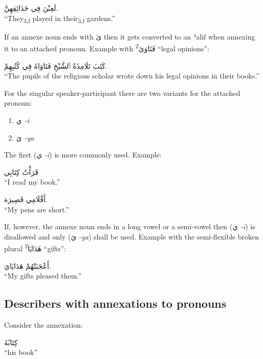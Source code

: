 \documentclass[
  10pt,
]{book}
\providecommand{\tightlist}{%
  \setlength{\itemsep}{0pt}\setlength{\parskip}{0pt}}
\begin{document}
\foreignlanguage{arabic}{لَعِبْنَ فِي حَدَائِقِهِنَّ.}\\
\enquote{They\textsubscript{3,f} played in their\textsubscript{3,f} gardens.}

If an annexe noun ends with \foreignlanguage{arabic}{ىٰ} then it gets converted to an ʾalif when annexing it to an attached pronoun. Example with \textsuperscript{2}\foreignlanguage{arabic}{فَتَاوَىٰ} \enquote{legal opinions}:

\foreignlanguage{arabic}{کَتَبَ تَلَامِذَةُ ٱلشَّيْخِ فَتَاوَاهُ فِي کُتُبِهِمْ.}\\
\enquote{The pupils of the religious scholar wrote down his legal opinions in their books.}

For the singular speaker-participant there are two variants for the attached pronoun:

\begin{enumerate}
\def\labelenumi{\roman{enumi}.}
\tightlist
\item
  \foreignlanguage{arabic}{ي} \emph{-ī}
\item
  \foreignlanguage{arabic}{يَ} \emph{-ya}
\end{enumerate}

The first (\foreignlanguage{arabic}{ي} \emph{-ī}) is more commonly used. Example:

\foreignlanguage{arabic}{قَرَأْتُ کِتَابِي}\\
\enquote{I read my book.}

\foreignlanguage{arabic}{أَقْلَامِي قَصِيرَة.}\\
\enquote{My pens are short.}

If, however, the annexe noun ends in a long vowel or a semi-vowel then
(\foreignlanguage{arabic}{ي} \emph{-ī}) is disallowed and only
(\foreignlanguage{arabic}{يَ} \emph{-ya}) shall be used.
Example with the semi-flexible broken plural \textsuperscript{2}\foreignlanguage{arabic}{هَدَايَا} \enquote{gifts}:

\foreignlanguage{arabic}{أَعْجَبَتْهُمْ هَدَايَايَ.}\\
\enquote{My gifts pleased them.}

\subsection{Describers with annexations to pronouns}\label{describers-with-annexations-to-pronouns}

Consider the annexation:

\foreignlanguage{arabic}{کِتَابُهُ}\\
\enquote{his book}
\end{document}
